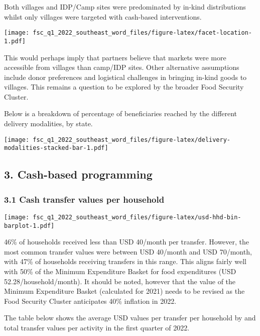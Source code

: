 \documentclass[
]{article}
\begin{document}
Both villages and IDP/Camp sites were predominated by in-kind
distributions whilst only villages were targeted with cash-based
interventions.

\texttt{[image: fsc\_q1\_2022\_southeast\_word\_files/figure-latex/facet-location-1.pdf]}

This would perhaps imply that partners believe that markets were more
accessible from villages than camp/IDP sites. Other alternative
assumptions include donor preferences and logistical challenges in
bringing in-kind goods to villages. This remains a question to be
explored by the broader Food Security Cluster.

Below is a breakdown of percentage of beneficiaries reached by the
different delivery modalities, by state.

\texttt{[image: fsc\_q1\_2022\_southeast\_word\_files/figure-latex/delivery-modalities-stacked-bar-1.pdf]}

\hypertarget{cash-based-programming}{%
\subsection{3. Cash-based programming}\label{cash-based-programming}}

\hypertarget{cash-transfer-values-per-household}{%
\subsubsection{3.1 Cash transfer values per
household}\label{cash-transfer-values-per-household}}

\texttt{[image: fsc\_q1\_2022\_southeast\_word\_files/figure-latex/usd-hhd-bin-barplot-1.pdf]}

46\% of households received less than USD 40/month per transfer.
However, the most common transfer values were between USD 40/month and
USD 70/month, with 47\% of households receiving transfers in this range.
This aligns fairly well with 50\% of the Minimum Expenditure Basket for
food expenditures (USD 52.28/household/month). It should be noted,
however that the value of the Minimum Expenditure Basket (calculated for
2021) needs to be revised as the Food Security Cluster anticipates 40\%
inflation in 2022.

The table below shows the average USD values per transfer per household
by and total transfer values per activity in the first quarter of 2022.
\end{document}
